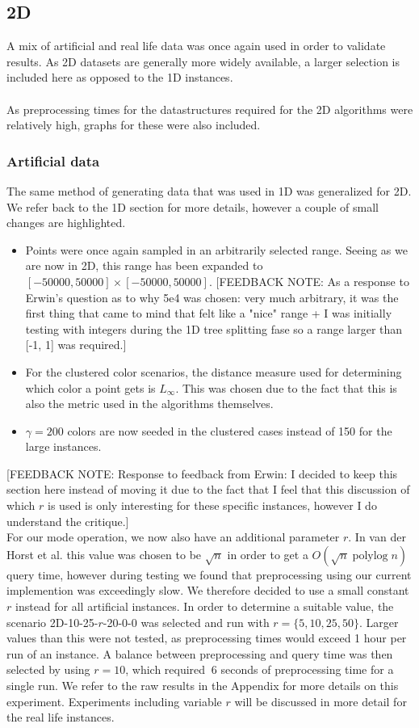 \documentclass{article}
\newcommand{\fb}[1]{{\color{blue}#1}}
\newcommand{\fbnote}[1]{{\color{blue}[FEEDBACK NOTE: #1]\\}}
\DeclareMathOperator{\polylog}{polylog}
\begin{document}
\subsection{2D}
A mix of artificial and real life data was once again used in order to validate
results. As 2D datasets are generally more widely available, a larger selection
is included here as opposed to the 1D instances. \\\\ As preprocessing times
for the datastructures required for the 2D algorithms were relatively high,
graphs for these were also included. \subsubsection*{Artificial data} The same
method of generating data that was used in 1D was generalized for 2D. We refer
back to the 1D section for more details, however a couple of small changes are
highlighted.
\begin{itemize}
    \item Points were once again sampled in an arbitrarily selected range. Seeing as we
          are now in 2D, this range has been expanded to $[-50000, 50000] \times [-50000,
                  50000]$. \fbnote{As a response to Erwin's question as to why 5e4 was chosen: very much arbitrary, it was the first thing that came to mind that felt like a "nice" range + I was initially testing with integers during the 1D tree splitting fase so a range larger than [-1, 1] was required.}
    \item For the clustered color scenarios, the distance measure used for determining
          which color a point gets is $L_\infty$. This was chosen due to the fact that
          this is also the metric used in the algorithms themselves.
    \item $\gamma=200$ colors are now seeded in the clustered cases instead of 150 for the large instances.
\end{itemize}
\fbnote{Response to feedback from Erwin: I decided to keep this section here instead of moving it due to the fact that I feel that this discussion of which $r$ is used is only interesting for these specific instances, however I do understand the critique.}
\fb{For our mode operation, we now also have an additional parameter $r$. In van der Horst et al. this value was chosen to be $\sqrt{n}$ in order to get a $O(\sqrt{n} \polylog n)$ query time, however during testing we found that preprocessing using our current implemention was exceedingly slow. We therefore decided to use a small constant $r$ instead for all artificial instances. In order to determine a suitable value, the scenario 2D-10-25-$r$-20-0-0 was selected and run with $r=\{ 5, 10, 25, 50 \}$. Larger values than this were not tested, as preprocessing times would exceed 1 hour per run of an instance. A balance between preprocessing and query time was then selected by using $r=10$, which required $~6$ seconds of preprocessing time for a single run. We refer to the raw results in the Appendix for more details on this experiment. Experiments including variable $r$ will be discussed in more detail for the real life instances.} \\\\
\end{document}
